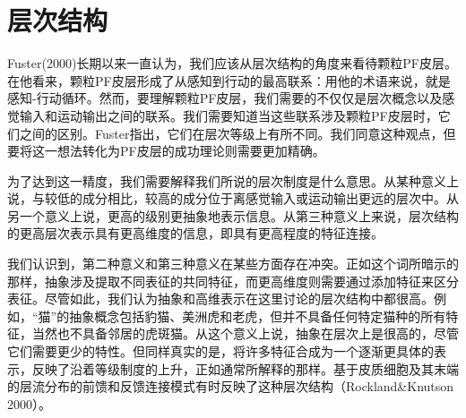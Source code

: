 \section{层次结构}
\par
Fuster(2000)长期以来一直认为，我们应该从层次结构的角度来看待颗粒PF皮层。在他看来，颗粒PF皮层形成了从感知到行动的最高联系：用他的术语来说，就是感知-行动循环。然而，要理解颗粒PF皮层，我们需要的不仅仅是层次概念以及感觉输入和运动输出之间的联系。我们需要知道当这些联系涉及颗粒PF皮层时，它们之间的区别。Fuster指出，它们在层次等级上有所不同。我们同意这种观点，但要将这一想法转化为PF皮层的成功理论则需要更加精确。
\par
为了达到这一精度，我们需要解释我们所说的层次制度是什么意思。从某种意义上说，与较低的成分相比，较高的成分位于离感觉输入或运动输出更远的层次中。从另一个意义上说，更高的级别更抽象地表示信息。从第三种意义上来说，层次结构的更高层次表示具有更高维度的信息，即具有更高程度的特征连接。
\par
我们认识到，第二种意义和第三种意义在某些方面存在冲突。正如这个词所暗示的那样，抽象涉及提取不同表征的共同特征，而更高维度则需要通过添加特征来区分表征。尽管如此，我们认为抽象和高维表示在这里讨论的层次结构中都很高。例如，“猫”的抽象概念包括豹猫、美洲虎和老虎，但并不具备任何特定猫种的所有特征，当然也不具备邻居的虎斑猫。从这个意义上说，抽象在层次上是很高的，尽管它们需要更少的特性。但同样真实的是，将许多特征合成为一个逐渐更具体的表示，反映了沿着等级制度的上升，正如通常所解释的那样。基于皮质细胞及其末端的层流分布的前馈和反馈连接模式有时反映了这种层次结构（Rockland\&Knutson 2000）。

